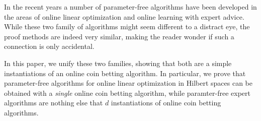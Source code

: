 In the recent years a number of parameter-free algorithms have been developed in the areas of online linear optimization and online learning with expert advice. While these two family of algorithms might seem different to a distract eye, the proof methods are indeed very similar, making the reader wonder if such a connection is only accidental.

In this paper, we unify these two families, showing that both are a simple instantiations of an online coin betting algorithm. In particular, we prove that parameter-free algorithms for online linear optimization in Hilbert spaces can be obtained with a \emph{single} online coin betting algorithm, while paramter-free expert algorithms are nothing else that $d$ instantiations of online coin betting algorithms.

